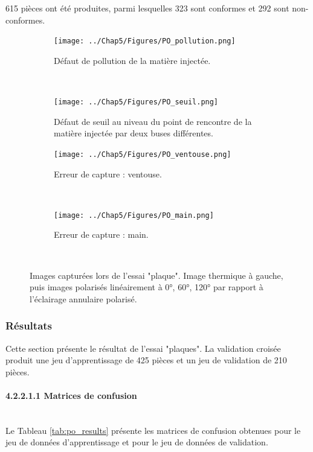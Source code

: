 615 pièces ont été produites, parmi lesquelles 323 sont conformes et 292 sont non-conformes.

\begin{figure}[bth!]
	\centering
	\begin{subfigure}[c]{\textwidth}
		\texttt{[image: ../Chap5/Figures/PO\_pollution.png]}
		\caption{Défaut de pollution de la matière injectée.}
		\vspace*{1mm}
	\end{subfigure}
	\\
	\begin{subfigure}[c]{\textwidth}
		\texttt{[image: ../Chap5/Figures/PO\_seuil.png]}
		\caption{Défaut de seuil au niveau du point de rencontre de la matière injectée par deux buses différentes.}
		\vspace*{1mm}
	\end{subfigure}
	\begin{subfigure}[c]{\textwidth}
		\texttt{[image: ../Chap5/Figures/PO\_ventouse.png]}
		\caption{Erreur de capture : ventouse.}
		\vspace*{1mm}
	\end{subfigure}
	\\
	\begin{subfigure}[c]{\textwidth}
		\texttt{[image: ../Chap5/Figures/PO\_main.png]}
		\caption{Erreur de capture : main.}
		\vspace*{1mm}
	\end{subfigure}
	\\
	\caption[Images capturées lors de l'essai "plaque".]{Images capturées lors de l'essai "plaque". Image thermique à gauche, puis images polarisés linéairement à 0°, 60°, 120° par rapport à l'éclairage annulaire polarisé.}
	\label{fig:po_trial}
\end{figure}


\subsubsection{Résultats}
Cette section présente le résultat de l'essai "plaques".
La validation croisée produit une jeu d'apprentissage de 425 pièces et un jeu de validation de 210 pièces.

\paragraph{4.2.2.1.1 Matrices de confusion} \mbox{} \\
Le Tableau \ref{tab:po_results} présente les matrices de confusion obtenues pour le jeu de données d'apprentissage et pour le jeu de données de validation.

